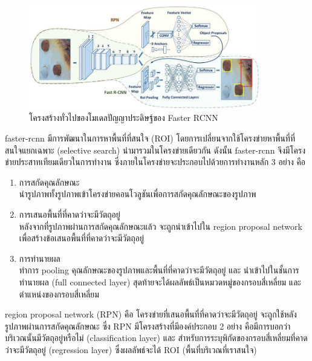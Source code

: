 \begin{figure}[!ht]
    \centering
    \includegraphics[width=0.9\textwidth]{chapter2/images/faster_rcnn.png}
    \caption{โครงสร้างทั่วไปของโมเดลปัญญาประดิษฐ์ของ Faster RCNN}
    \label{fig:faster_rcnn_architecture}
\end{figure}
\par faster-rcnn มีการพัฒนาในการหาพื้นที่ที่สนใจ (ROI) โดยการเปลี่ยนจากใช้โครงข่ายหาพื้นที่ที่สนใจแยกเฉพาะ (selective search) นำมารวมในโครงข่ายเดียวกัน ดังนั้น faster-rcnn จึงมีโครงข่ายประสาทเทียมเดียวในการทำงาน ซึ่งภายในโครงข่ายจะประกอบไปด้วยการทำงานหลัก 3 อย่าง คือ
\begin{enumerate}
	\setlength\itemsep{-0.25em}
	\item การสกัดคุณลักษณะ
	\\	นำรูปภาพทั้งรูปภาพเข้าโครงข่ายคอนโวลูชันเพื่อการสกัดคุณลักษณะของรูปภาพ
	\item การเสนอพื้นที่ที่คาดว่าจะมีวัตถุอยู่
	\\	หลังจากที่รูปภาพผ่านการสกัดคุณลักษณะแล้ว จะถูกนำเข้าไปใน region proposal network เพื่อสร้างข้อเสนอพื้นที่ที่คาดว่าจะมีวัตถุอยู่
	\item การทำนายผล
	\\	ทำการ pooling คุณลักษณะของรูปภาพและพื้นที่ที่คาดว่าจะมีวัตถุอยู่ และ นำเข้าไปในชั้นการทำนายผล (full connected layer) สุดท้ายจะได้ผลลัพธ์เป็นหมวดหมู่ของกรอบสี่เหลี่ยม และ ตำแหน่งของกรอบสี่เหลี่ยม  
\end{enumerate}
\par region proposal network (RPN) คือ โครงข่ายที่เสนอพื้นที่ที่คาดว่าจะมีวัตถุอยู่ จะถูกใช้หลังรูปภาพผ่านการสกัดคุณลักษณะ ซึ่ง RPN มีโครงสร้างที่มีองค์ประกอบ 2 อย่าง
คือมีการบอกว่าบริเวณนั้นมีวัตถุอยู่หรือไม่ (classification layer) และ สำหรับการระบุพิกัดของกรอบสี่เหลี่ยมที่คาดว่าจะมีวัตถุอยู่ (regression layer) ซึ่งผลลัพธ์จะได้ ROI (พื้นที่บริเวณที่เราสนใจ)